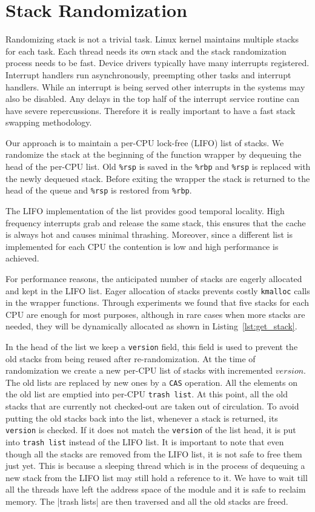 \section{Stack Randomization}
\label{se:stack_randomization}
Randomizing stack is not a trivial task. Linux kernel maintains multiple stacks for each task. Each thread needs its own stack and the stack randomization process needs to be fast. Device drivers typically have many interrupts registered. Interrupt handlers run asynchronously, preempting other tasks and interrupt handlers. While an interrupt is being served other interrupts in the systems may also be disabled. Any delays in the top half of the interrupt service routine can have severe repercussions. Therefore it is really important to have a fast stack swapping methodology.

Our approach is to maintain a per-CPU lock-free (LIFO) list of stacks. We randomize the stack at the beginning of the function wrapper by dequeuing the head of the per-CPU list. Old \verb|%rsp| is saved in the \verb|%rbp| and \verb|%rsp| is replaced with the newly dequeued stack. Before exiting the wrapper the stack is returned to the head of the queue and \verb|%rsp| is restored from \verb|%rbp|.

The LIFO implementation of the list provides good temporal locality. High frequency interrupts grab and release the same stack, this ensures that the cache is always hot and causes minimal thrashing. Moreover, since a different list is implemented for each CPU the contention is low and high performance is achieved.

For performance reasons, the anticipated number of stacks are eagerly allocated and kept in the LIFO list. Eager allocation of stacks prevents costly \verb|kmalloc| calls in the wrapper functions. Through experiments we found that five stacks for each CPU are enough for most purposes, although in rare cases when more stacks are needed, they will be dynamically allocated as shown in Listing~\ref{lst:get_stack}.

In the head of the list we keep a \verb|version| field, this field is used to prevent the old stacks from being reused after re-randomization. At the time of randomization we create a new per-CPU list of stacks with incremented $version$. The old lists are replaced by new ones by a \verb|CAS| operation. All the elements on the old list are emptied into per-CPU \verb|trash list|. At this point, all the old stacks that are currently not checked-out are taken out of circulation. To avoid putting the old stacks back into the list, whenever a stack is returned, its \verb|version| is checked. If it does not match the \verb|version| of the list head, it is put into \verb|trash list| instead of the LIFO list. It is important to note that even though all the stacks are removed from the LIFO list, it is not safe to free them just yet. This is because a sleeping thread which is in the process of dequeuing a new stack from the LIFO list may still hold a reference to it. We have to wait till all the threads have left the address space of the module and it is safe to reclaim memory. The |trash lists| are then traversed and all the old stacks are freed.

